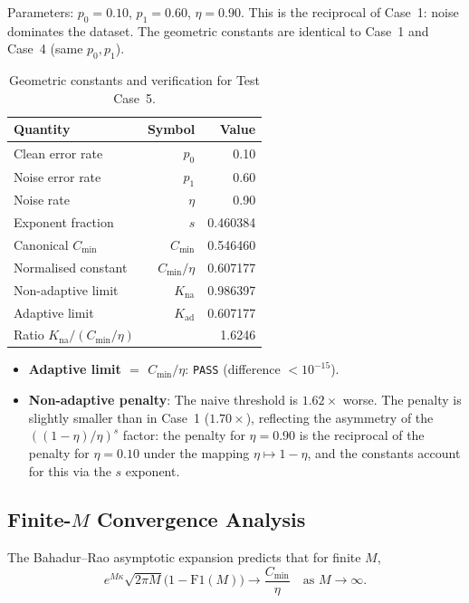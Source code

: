 \documentclass[article]{amsart}
\theoremstyle{definition}
\begin{document}
Parameters: $p_0 = 0.10$, $p_1 = 0.60$, $\eta = 0.90$. This is the reciprocal of Case~1: noise dominates the dataset. The geometric constants are identical to Case~1 and Case~4 (same $p_0, p_1$).

\begin{table}[htbp]
\centering
\caption{Geometric constants and verification for Test Case~5.}
\label{tab:case5}
\begin{tabular}{lrr}
\toprule
Quantity & Symbol & Value \\
\midrule
Clean error rate & $p_0$ & 0.10 \\
Noise error rate & $p_1$ & 0.60 \\
Noise rate & $\eta$ & 0.90 \\
Exponent fraction & $s$ & 0.460384 \\
\midrule
Canonical $C_{\min}$ & $C_{\min}$ & 0.546460 \\
Normalised constant & $C_{\min}/\eta$ & 0.607177 \\
Non-adaptive limit & $K_{\mathrm{na}}$ & 0.986397 \\
Adaptive limit & $K_{\mathrm{ad}}$ & 0.607177 \\
Ratio $K_{\mathrm{na}} / (C_{\min}/\eta)$ & & 1.6246 \\
\bottomrule
\end{tabular}
\end{table}

\begin{itemize}
    \item\textbf{Adaptive limit $=$ $C_{\min}/\eta$}: \texttt{PASS} (difference $< 10^{-15}$).
    \item\textbf{Non-adaptive penalty}: The naive threshold is $1.62\times$ worse. The penalty is slightly smaller than in Case~1 ($1.70\times$), reflecting the asymmetry of the $((1-\eta)/\eta)^s$ factor: the penalty for $\eta=0.90$ is the reciprocal of the penalty for $\eta=0.10$ under the mapping $\eta \mapsto 1-\eta$, and the constants account for this via the $s$ exponent.
\end{itemize}

\subsection{Finite-$M$ Convergence Analysis}

The Bahadur--Rao asymptotic expansion predicts that for finite $M$,
\begin{equation}
e^{M\kappa} \sqrt{2\pi M} \bigl(1 - \mathrm{F1}(M)\bigr) \longrightarrow \frac{C_{\min}}{\eta} \quad \text{as } M\to\infty.
\end{equation}
\end{document}
